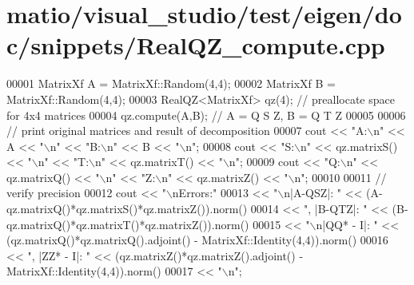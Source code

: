 \hypertarget{matio_2visual__studio_2test_2eigen_2doc_2snippets_2_real_q_z__compute_8cpp_source}{}\section{matio/visual\+\_\+studio/test/eigen/doc/snippets/\+Real\+Q\+Z\+\_\+compute.cpp}
\label{matio_2visual__studio_2test_2eigen_2doc_2snippets_2_real_q_z__compute_8cpp_source}

\begin{DoxyCode}
00001 MatrixXf A = MatrixXf::Random(4,4);
00002 MatrixXf B = MatrixXf::Random(4,4);
00003 RealQZ<MatrixXf> qz(4); \textcolor{comment}{// preallocate space for 4x4 matrices}
00004 qz.compute(A,B);  \textcolor{comment}{// A = Q S Z,  B = Q T Z}
00005 
00006 \textcolor{comment}{// print original matrices and result of decomposition}
00007 cout << \textcolor{stringliteral}{"A:\(\backslash\)n"} << A << \textcolor{stringliteral}{"\(\backslash\)n"} << \textcolor{stringliteral}{"B:\(\backslash\)n"} << B << \textcolor{stringliteral}{"\(\backslash\)n"};
00008 cout << \textcolor{stringliteral}{"S:\(\backslash\)n"} << qz.matrixS() << \textcolor{stringliteral}{"\(\backslash\)n"} << \textcolor{stringliteral}{"T:\(\backslash\)n"} << qz.matrixT() << \textcolor{stringliteral}{"\(\backslash\)n"};
00009 cout << \textcolor{stringliteral}{"Q:\(\backslash\)n"} << qz.matrixQ() << \textcolor{stringliteral}{"\(\backslash\)n"} << \textcolor{stringliteral}{"Z:\(\backslash\)n"} << qz.matrixZ() << \textcolor{stringliteral}{"\(\backslash\)n"};
00010 
00011 \textcolor{comment}{// verify precision}
00012 cout << \textcolor{stringliteral}{"\(\backslash\)nErrors:"}
00013   << \textcolor{stringliteral}{"\(\backslash\)n|A-QSZ|: "} << (A-qz.matrixQ()*qz.matrixS()*qz.matrixZ()).norm()
00014   << \textcolor{stringliteral}{", |B-QTZ|: "} << (B-qz.matrixQ()*qz.matrixT()*qz.matrixZ()).norm()
00015   << \textcolor{stringliteral}{"\(\backslash\)n|QQ* - I|: "} << (qz.matrixQ()*qz.matrixQ().adjoint() - MatrixXf::Identity(4,4)).norm()
00016   << \textcolor{stringliteral}{", |ZZ* - I|: "} << (qz.matrixZ()*qz.matrixZ().adjoint() - MatrixXf::Identity(4,4)).norm()
00017   << \textcolor{stringliteral}{"\(\backslash\)n"};
\end{DoxyCode}
